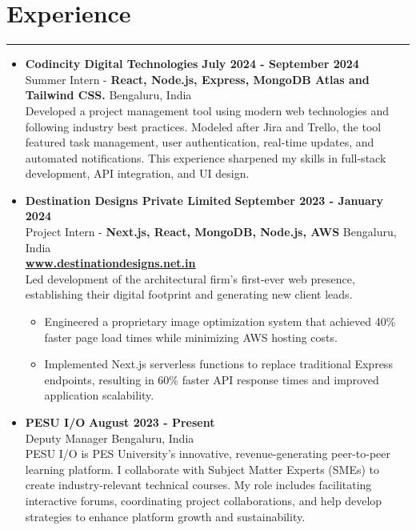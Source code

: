 \documentclass[a4paper,10.5pt]{article}
\begin{document}
\section*{Experience}
\vspace{-.5em}
\hrule
\vspace{0.4em}
\begin{itemize}
    \item \textbf{Codincity Digital Technologies} \hfill \textbf{July 2024 - September 2024} \vspace{0.3em} \\
    Summer Intern - \textbf{React, Node.js, Express, MongoDB Atlas and Tailwind CSS.} \vspace{0.3em} \hfill Bengaluru, India \\
    Developed a project management tool using modern web technologies and following industry best practices. Modeled after Jira and Trello, the tool featured task management, user authentication, real-time updates, and automated notifications. This experience sharpened my skills in full-stack development, API integration, and UI design.
          
    \item \vspace{0.3em} \textbf{Destination Designs Private Limited} \hfill \textbf{September 2023 - January 2024} \vspace{0.3em} \\
          Project Intern - \textbf{Next.js, React, MongoDB, Node.js, AWS} \hfill Bengaluru, India \\ \textbf{\href{https://www.destinationdesigns.net.in/}
          {\underline{www.destinationdesigns.net.in}}}  \vspace{0.3em} \\ Led development of the architectural firm's first-ever web presence, establishing their digital footprint and generating new client leads. 
	      \begin{itemize}
		      \item  Engineered a proprietary image optimization system that achieved 40\% faster page load times while minimizing AWS hosting costs.
		      \item  Implemented Next.js serverless functions to replace traditional Express endpoints, resulting in 60\% faster API response times and improved application scalability.
	      \end{itemize}
    \item \vspace{0.3em} \textbf{PESU I/O} \hfill \textbf{August 2023 - Present} \\
    Deputy Manager \hfill Bengaluru, India \vspace{0.3em} \\
    PESU I/O is PES University's innovative, revenue-generating peer-to-peer learning platform. I collaborate with Subject Matter Experts (SMEs) to create industry-relevant technical courses. My role includes facilitating interactive forums, coordinating project collaborations, and help develop strategies to enhance platform growth and sustainability.
\vspace{-0.9em}
\end{itemize}
\end{document}
